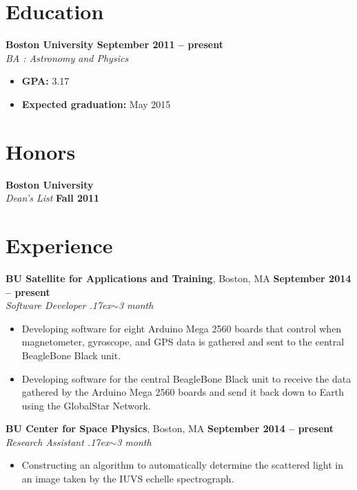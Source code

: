 \documentclass[line]{resume}
\newcommand{\about}{\raise.17ex\hbox{$\scriptstyle\mathtt{\sim}$}}
\begin{document}
\begin{resume}
    \section{\mysidestyle Education}
    \textbf{Boston University \hfill September 2011 -- present} \\
    \textsl{BA : Astronomy and Physics}
    \vspace{1mm}
    \begin{itemize}[leftmargin=2em]
        \item \textbf{GPA:} 3.17
        \item \textbf{Expected graduation:} May 2015
    \end{itemize}
    
    
    \section{\mysidestyle Honors}
    \textbf{Boston University} \\
    \textsl{Dean's List} \hfill \textbf{Fall 2011}
    
    
    \section{\mysidestyle Experience}
    
    \textbf{BU Satellite for Applications and Training}, Boston, MA \hfill \textbf{September 2014 -- present} \\
    \textsl{Software Developer \hfill \about 3 month}
    \vspace{1mm}
    \begin{itemize}[leftmargin=2em]
        \item Developing software for eight Arduino Mega 2560 boards that control
          when magnetometer, gyroscope, and GPS data is gathered and sent to the
          central BeagleBone Black unit.
        \item Developing software for the central BeagleBone Black unit to receive
          the data gathered by the Arduino Mega 2560 boards and send it back down to
          Earth using the GlobalStar Network.
    \end{itemize}
    
    \textbf{BU Center for Space Physics}, Boston, MA \hfill \textbf{September 2014 -- present} \\
    \textsl{Research Assistant \hfill \about 3 month}
    \vspace{1mm}
    \begin{itemize}[leftmargin=2em]
        \item Constructing an algorithm to automatically determine the scattered light in
        an image taken by the IUVS echelle spectrograph. 
    \end{itemize}
    

\end{resume}
\end{document}
